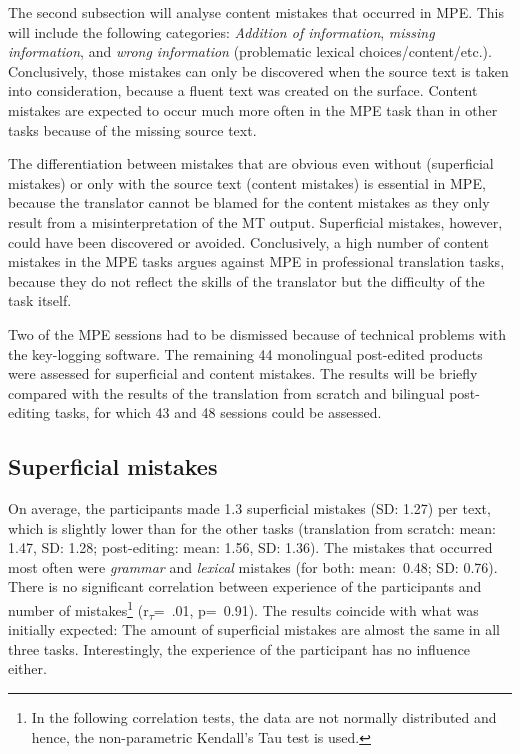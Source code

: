 \documentclass[output=paper]{langsci/langscibook}
\begin{document}
The second subsection will analyse content mistakes that occurred in MPE. This will include the following categories: \textit{Addition of information}, \textit{missing information}, and \textit{wrong information} (problematic lexical choices/content/etc.). Conclusively, those mistakes can only be discovered when the source text is taken into consideration, because a fluent text was created on the surface. Content mistakes are expected to occur much more often in the MPE task than in other tasks because of the missing source text.



The differentiation between mistakes that are obvious even without (superficial mistakes) or only with the source text (content mistakes) is essential in MPE, because the translator cannot be blamed for the content mistakes as they only result from a misinterpretation of the MT output. Superficial mistakes, however, could have been discovered or avoided. Conclusively, a high number of content mistakes in the MPE tasks argues against MPE in professional translation tasks, because they do not reflect the skills of the translator but the difficulty of the task itself.



Two of the MPE sessions had to be dismissed because of technical problems with the key-logging software. The remaining 44 monolingual post-edited products were assessed for superficial and content mistakes. The results will be briefly compared with the results of the translation from scratch and bilingual post-editing tasks, for which 43 and 48 sessions could be assessed.


\subsection{Superficial mistakes\label{nitzke:sec:SuperficialMistakes}}

On average, the participants made 1.3 superficial mistakes (SD: 1.27) per text, which is slightly lower than for the other tasks (translation from scratch: mean: 1.47, SD: 1.28; post-editing: mean: 1.56, SD: 1.36). The mistakes that occurred most often were \textit{grammar} and \textit{lexical} mistakes (for both: mean:~0.48; SD: 0.76). There is no significant correlation between experience of the participants and number of mistakes\footnote{In the following correlation tests, the data are not normally distributed and hence, the non-parametric Kendall's Tau test is used.} (r\textsubscript{$\tau $}=~.01, p=~0.91). The results coincide with what was initially expected: The amount of superficial mistakes are almost the same in all three tasks. Interestingly, the experience of the participant has no influence either.
\end{document}
